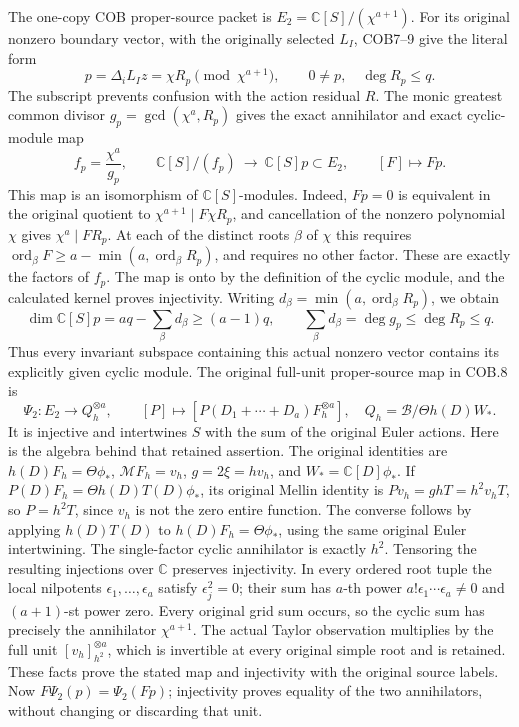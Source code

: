 \documentclass[11pt,a4paper]{article}
\begin{document}
The one-copy COB proper-source packet is
\(E_2=\mathbb C[S]/(\chi^{a+1})\).
For its original nonzero boundary vector, with the originally selected
\(L_I\), COB7--9 give the literal
form
\begin{equation}
 p=\Delta_iL_Iz=\chi R_p\pmod{\chi^{a+1}},
 \qquad 0\ne p,\quad \deg R_p\leq q .
 \tag{CJA20}
\end{equation}
The subscript prevents confusion with the action residual \(R\).
The monic greatest common divisor
\(g_p=\gcd(\chi^a,R_p)\) gives the exact annihilator and exact
cyclic-module map
\begin{equation}
 f_p=\frac{\chi^a}{g_p},\qquad
 \mathbb C[S]/(f_p)\ \longrightarrow\ \mathbb C[S]p\subset E_2,
 \qquad [F]\longmapsto Fp .
 \tag{CJA21}
\end{equation}
This map is an isomorphism of \(\mathbb C[S]\)-modules.
Indeed, \(Fp=0\) is equivalent in the original quotient to
\(\chi^{a+1}\mid F\chi R_p\), and cancellation of the nonzero
polynomial \(\chi\) gives \(\chi^a\mid FR_p\).
At each of the distinct roots \(\beta\) of \(\chi\) this requires
\(\operatorname{ord}_\beta F\geq
a-\min(a,\operatorname{ord}_\beta R_p)\), and requires no other
factor.  These are exactly the factors of \(f_p\).
The map is onto by the definition of the cyclic module, and the
calculated kernel proves injectivity.
Writing \(d_\beta=\min(a,\operatorname{ord}_\beta R_p)\), we obtain
\begin{equation}
 \dim\mathbb C[S]p
   =aq-\sum_\beta d_\beta\geq(a-1)q,\qquad
 \sum_\beta d_\beta=\deg g_p\leq\deg R_p\leq q .
 \tag{CJA22}
\end{equation}
Thus every invariant subspace containing this actual nonzero vector
contains its explicitly given cyclic module.
The original full-unit proper-source map in COB.8 is
\[
 \Psi_2:E_2\longrightarrow Q_h^{\otimes a},\qquad
 [P]\longmapsto
 [P(D_1+\cdots+D_a)F_h^{\otimes a}],
 \quad Q_h=\mathscr B/\Theta h(D)W_* .
 \]
It is injective and intertwines \(S\) with the sum of the original
Euler actions.  Here is the algebra behind that retained assertion.
The original identities are \(h(D)F_h=\Theta\phi_*\),
\(\mathcal MF_h=v_h\), \(g=2\xi=hv_h\), and
\(W_*=\mathbb C[D]\phi_*\).
If \(P(D)F_h=\Theta h(D)T(D)\phi_*\), its original Mellin
identity is \(Pv_h=ghT=h^2v_hT\), so
\(P=h^2T\), since \(v_h\) is not the zero entire function.
The converse follows by applying \(h(D)T(D)\) to
\(h(D)F_h=\Theta\phi_*\), using the same original Euler
intertwining.  The single-factor cyclic annihilator is exactly
\(h^2\).
Tensoring the resulting injections over \(\mathbb C\) preserves
injectivity.  In every ordered root tuple the local nilpotents
\(\epsilon_1,\ldots,\epsilon_a\) satisfy \(\epsilon_j^2=0\);
their sum has \(a\)-th power
\(a!\epsilon_1\cdots\epsilon_a\ne0\) and \((a+1)\)-st power zero.
Every original grid sum occurs, so the cyclic sum has precisely
the annihilator \(\chi^{a+1}\).
The actual Taylor observation multiplies by the full unit
\([v_h]_{h^2}^{\otimes a}\), which is invertible at every original
simple root and is retained.
These facts prove the stated map and injectivity with the original
source labels.
Now \(F\Psi_2(p)=\Psi_2(Fp)\); injectivity proves equality of the
two annihilators, without changing or discarding that unit.
\end{document}
